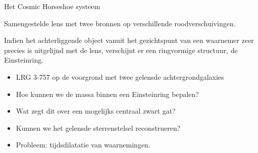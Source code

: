 \documentclass[aspectratio=169,xcolor=dvipsnames]{beamer}
\begin{document}
\begin{frame}{Het Cosmic Horseshoe systeem}

    

    Samengestelde lens met twee bronnen op verschillende roodverschuivingen.


    Indien het achterliggende object vanuit het gezichtspunt van een waarnemer zeer precies is uitgelijnd met de lens, verschijnt er een ringvormige structuur, de Einsteinring.
    
    \begin{itemize}
        \item LRG 3-757 op de voorgrond met twee gelensde achtergrondgalaxies
        \item Hoe kunnen we de massa binnen een Einsteinring bepalen? 
        \item Wat zegt dit over een mogelijks centraal zwart gat?
        \item Kunnen we het gelensde sterrenstelsel reconstrueren?        \item Probleem: tijdsdilatatie van waarnemingen.
      \end{itemize}
\end{frame}
\end{document}
